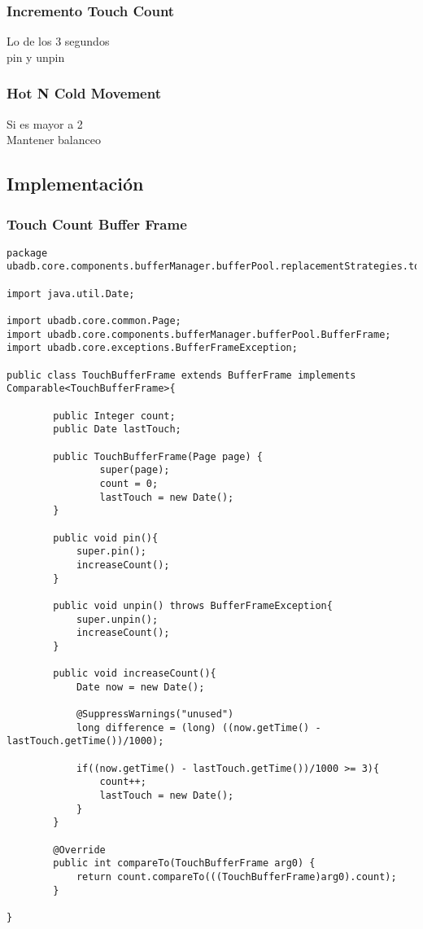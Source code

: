 \subsubsection{Incremento Touch Count}

Lo de los 3 segundos\\
pin y unpin\\

\subsubsection{Hot N Cold Movement}

Si es mayor a 2\\
Mantener balanceo\\

\subsection{Implementación}
\subsubsection{Touch Count Buffer Frame}

\begin{lstlisting}
package ubadb.core.components.bufferManager.bufferPool.replacementStrategies.touchcount;

import java.util.Date;

import ubadb.core.common.Page;
import ubadb.core.components.bufferManager.bufferPool.BufferFrame;
import ubadb.core.exceptions.BufferFrameException;

public class TouchBufferFrame extends BufferFrame implements Comparable<TouchBufferFrame>{
        
		public Integer count;
		public Date lastTouch;
	
        public TouchBufferFrame(Page page) {
                super(page);
                count = 0;
                lastTouch = new Date();
        }
        
        public void pin(){
        	super.pin();
        	increaseCount();
        }
        
        public void unpin() throws BufferFrameException{
        	super.unpin();
        	increaseCount();
        }
        
        public void increaseCount(){
        	Date now = new Date();
        	
        	@SuppressWarnings("unused")
			long difference = (long) ((now.getTime() - lastTouch.getTime())/1000);
        	
        	if((now.getTime() - lastTouch.getTime())/1000 >= 3){
        		count++;
        		lastTouch = new Date();
        	}
        }

		@Override
		public int compareTo(TouchBufferFrame arg0) {
			return count.compareTo(((TouchBufferFrame)arg0).count);
		}

}
\end{lstlisting}

